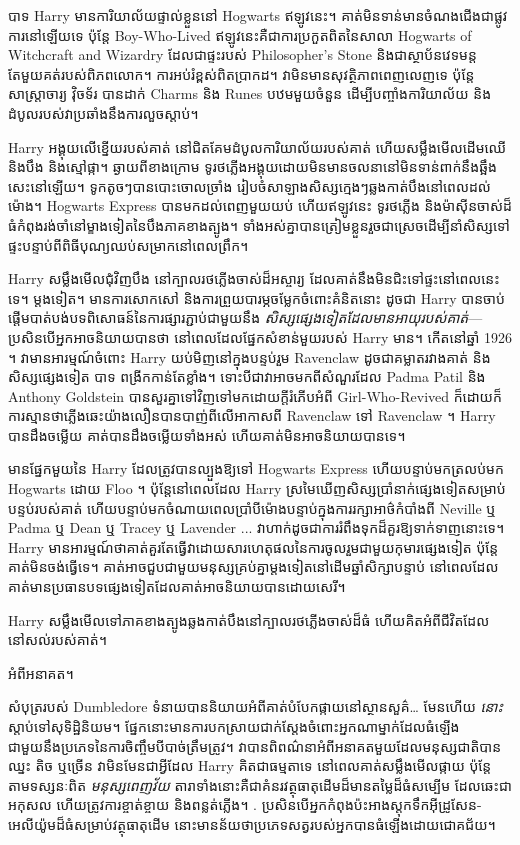 បាទ Harry មានការិយាល័យផ្ទាល់ខ្លួននៅ Hogwarts ឥឡូវនេះ។ គាត់មិនទាន់មានចំណងជើងជាផ្លូវការនៅឡើយទេ ប៉ុន្តែ Boy-Who-Lived ឥឡូវនេះគឺជាការប្រកួតពិតនៃសាលា Hogwarts of Witchcraft and Wizardry ដែលជាផ្ទះរបស់ Philosopher's Stone និងជាស្ថាប័នវេទមន្តតែមួយគត់របស់ពិភពលោក។ ការអប់រំខ្ពស់ពិតប្រាកដ។ វាមិនមានសុវត្ថិភាពពេញលេញទេ ប៉ុន្តែសាស្រ្តាចារ្យ វ៉ិចទ័រ បានដាក់ Charms និង Runes បឋមមួយចំនួន ដើម្បីបញ្ចាំងការិយាល័យ និងដំបូលរបស់វាប្រឆាំងនឹងការលួចស្តាប់។

Harry អង្គុយលើខ្នើយរបស់គាត់ នៅជិតគែមដំបូលការិយាល័យរបស់គាត់ ហើយសម្លឹងមើលដើមឈើ និងបឹង និងស្មៅផ្កា។ ឆ្ងាយ​ពី​ខាង​ក្រោម ទូរថភ្លើង​អង្គុយ​ដោយ​មិន​មាន​ចលនា​នៅ​មិន​ទាន់​ពាក់​នឹង​ឆ្អឹង​សេះ​នៅ​ឡើយ។ ទូកតូចៗបានបោះចោលច្រាំង រៀបចំសាឡាងសិស្សក្មេងៗឆ្លងកាត់បឹងនៅពេលដល់ម៉ោង។ Hogwarts Express បានមកដល់ពេញមួយយប់ ហើយឥឡូវនេះ ទូរថភ្លើង និងម៉ាស៊ីនចាស់ដ៏ធំកំពុងរង់ចាំនៅម្ខាងទៀតនៃបឹងភាគខាងត្បូង។ ទាំងអស់គ្នាបានត្រៀមខ្លួនរួចជាស្រេចដើម្បីនាំសិស្សទៅផ្ទះបន្ទាប់ពីពិធីបុណ្យឈប់សម្រាកនៅពេលព្រឹក។

Harry សម្លឹងមើលជុំវិញបឹង នៅក្បាលរថភ្លើងចាស់ដ៏អស្ចារ្យ ដែលគាត់នឹងមិនជិះទៅផ្ទះនៅពេលនេះទេ។ ម្តងទៀត។ មានការសោកសៅ និងការព្រួយបារម្ភចម្លែកចំពោះគំនិតនោះ ដូចជា Harry បានចាប់ផ្តើមបាត់បង់បទពិសោធន៍នៃការផ្សារភ្ជាប់ជាមួយនឹង \emph{សិស្សផ្សេងទៀតដែលមានអាយុរបស់គាត់}—ប្រសិនបើអ្នកអាចនិយាយបានថា នៅពេលដែលផ្នែកសំខាន់មួយរបស់ Harry មាន។ កើតនៅឆ្នាំ 1926 ។ វាមានអារម្មណ៍ចំពោះ Harry យប់មិញនៅក្នុងបន្ទប់រួម Ravenclaw ដូចជាគម្លាតរវាងគាត់ និងសិស្សផ្សេងទៀត បាទ ពង្រីកកាន់តែខ្លាំង។ ទោះបីជាវាអាចមកពីសំណួរដែល Padma Patil និង Anthony Goldstein បានសួរគ្នាទៅវិញទៅមកដោយក្តីរំភើបអំពី Girl-Who-Revived ក៏ដោយក៏ការស្មានថាភ្លើងឆេះយ៉ាងលឿនបានបាញ់ពីលើអាកាសពី Ravenclaw ទៅ Ravenclaw ។ Harry បាន​ដឹង​ចម្លើយ គាត់​បាន​ដឹង​ចម្លើយ​ទាំង​អស់ ហើយ​គាត់​មិន​អាច​និយាយ​បាន​ទេ។

មានផ្នែកមួយនៃ Harry ដែលត្រូវបានល្បួងឱ្យទៅ Hogwarts Express ហើយបន្ទាប់មកត្រលប់មក Hogwarts ដោយ Floo ។ ប៉ុន្តែនៅពេលដែល Harry ស្រមៃឃើញសិស្សប្រាំនាក់ផ្សេងទៀតសម្រាប់បន្ទប់របស់គាត់ ហើយបន្ទាប់មកចំណាយពេលប្រាំបីម៉ោងបន្ទាប់ក្នុងការរក្សាអាថ៌កំបាំងពី Neville ឬ Padma ឬ Dean ឬ Tracey ឬ Lavender ... វាហាក់ដូចជាការរំពឹងទុកដ៏គួរឱ្យទាក់ទាញនោះទេ។ Harry មាន​អារម្មណ៍​ថា​គាត់​គួរ​តែ​ធ្វើ​វា​ដោយ​សារ​ហេតុផល​នៃ​ការ​ចូល​រួម​ជាមួយ​កុមារ​ផ្សេង​ទៀត ប៉ុន្តែ​គាត់​មិន​ចង់​ធ្វើ​\emph​ទេ។ គាត់អាចជួបជាមួយមនុស្សគ្រប់គ្នាម្តងទៀតនៅដើមឆ្នាំសិក្សាបន្ទាប់ នៅពេលដែលគាត់មានប្រធានបទផ្សេងទៀតដែលគាត់អាចនិយាយបានដោយសេរី។

Harry សម្លឹងមើលទៅភាគខាងត្បូងឆ្លងកាត់បឹងនៅក្បាលរថភ្លើងចាស់ដ៏ធំ ហើយគិតអំពីជីវិតដែលនៅសល់របស់គាត់។

អំពីអនាគត។

សំបុត្ររបស់ Dumbledore ទំនាយបាននិយាយអំពីគាត់បំបែកផ្កាយនៅស្ថានសួគ៌… មែនហើយ \emph{នោះ} ស្តាប់ទៅសុទិដ្ឋិនិយម។ ផ្នែកនោះមានការបកស្រាយជាក់ស្តែងចំពោះអ្នកណាម្នាក់ដែលធំឡើងជាមួយនឹងប្រភេទនៃការចិញ្ចឹមបីបាច់ត្រឹមត្រូវ។ វាបានពិពណ៌នាអំពីអនាគតមួយដែលមនុស្សជាតិបានឈ្នះ តិច ឬច្រើន វាមិនមែនជាអ្វីដែល Harry គិតជាធម្មតាទេ នៅពេលគាត់សម្លឹងមើលផ្កាយ ប៉ុន្តែតាមទស្សនៈពិត \emph{មនុស្សពេញវ័យ} តារាទាំងនោះគឺជាគំនរវត្ថុធាតុដើមដ៏មានតម្លៃដ៏ធំសម្បើម ដែលឆេះជាអកុសល ហើយត្រូវការខ្ចាត់ខ្ចាយ និងពន្លត់ភ្លើង។ . ប្រសិនបើអ្នកកំពុងប៉ះអាងស្តុកទឹកអ៊ីដ្រូសែន-អេលីយ៉ូមដ៏ធំសម្រាប់វត្ថុធាតុដើម នោះមានន័យថាប្រភេទសត្វរបស់អ្នកបានធំឡើងដោយជោគជ័យ។

